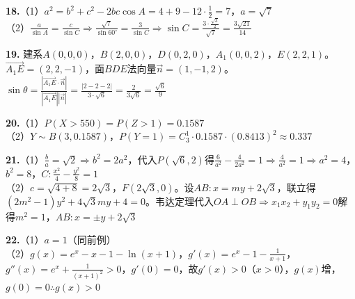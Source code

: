 \documentclass[12pt,a4paper]{ctexart}
\begin{document}
\textbf{18.}（1）$a^2=b^2+c^2-2bc\cos A=4+9-12\cdot\frac12=7$，$a=\sqrt7$\\
（2）$\frac{a}{\sin A}=\frac{c}{\sin C}\Rightarrow\frac{\sqrt7}{\sin60^\circ}=\frac{3}{\sin C}\Rightarrow\sin C=\frac{3\cdot\frac{\sqrt3}{2}}{\sqrt7}=\frac{3\sqrt{21}}{14}$

\textbf{19.} 建系$A(0,0,0)$，$B(2,0,0)$，$D(0,2,0)$，$A_1(0,0,2)$，$E(2,2,1)$。$\overrightarrow{A_1E}=(2,2,-1)$，面$BDE$法向量$\vec{n}=(1,-1,2)$。$\sin\theta=\frac{|\overrightarrow{A_1E}\cdot\vec{n}|}{|\overrightarrow{A_1E}||\vec{n}|}=\frac{|2-2-2|}{3\cdot\sqrt6}=\frac{2}{3\sqrt6}=\frac{\sqrt6}{9}$

\textbf{20.}（1）$P(X>550)=P(Z>1)=0.1587$\\
（2）$Y\sim B(3,0.1587)$，$P(Y=1)=C_3^1\cdot0.1587\cdot(0.8413)^2\approx0.337$

\textbf{21.}（1）$\frac{b}{a}=\sqrt2\Rightarrow b^2=2a^2$，代入$P(\sqrt6,2)$得$\frac{6}{a^2}-\frac{4}{2a^2}=1\Rightarrow\frac{4}{a^2}=1\Rightarrow a^2=4$，$b^2=8$，$C:\frac{x^2}{4}-\frac{y^2}{8}=1$\\
（2）$c=\sqrt{4+8}=2\sqrt3$，$F(2\sqrt3,0)$。设$AB:x=my+2\sqrt3$，联立得$(2m^2-1)y^2+4\sqrt3my+4=0$。韦达定理代入$OA\perp OB\Rightarrow x_1x_2+y_1y_2=0$解得$m^2=1$，$AB:x=\pm y+2\sqrt3$

\textbf{22.}（1）$a=1$（同前例）\\
（2）$g(x)=e^x-x-1-\ln(x+1)$，$g'(x)=e^x-1-\frac1{x+1}$，$g''(x)=e^x+\frac1{(x+1)^2}>0$，$g'(0)=0$，故$g'(x)>0$（$x>0$），$g(x)$增，$g(0)=0\therefore g(x)>0$
\end{document}

